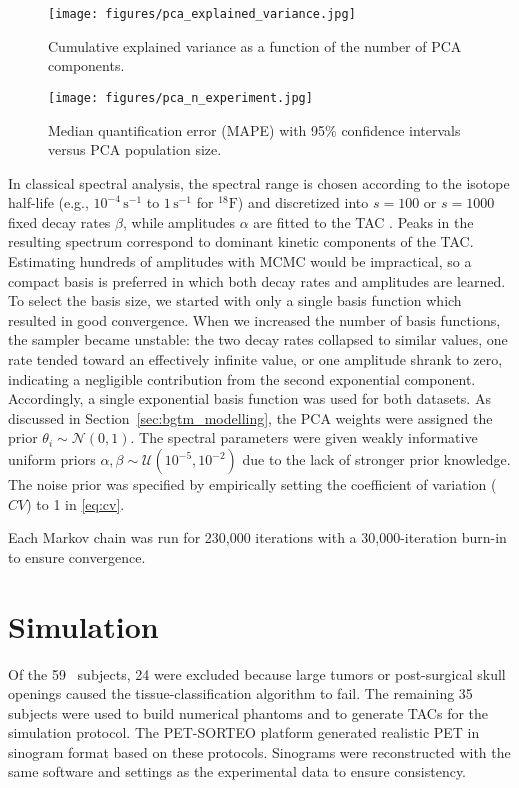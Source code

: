 \begin{figure}[h]
	\centering
	\texttt{[image: figures/pca\_explained\_variance.jpg]}
	\caption{Cumulative explained variance as a function of the number of PCA components.}
	\label{fig:pca_variance}
\end{figure}

\begin{figure}[h]
	\centering
	\texttt{[image: figures/pca\_n\_experiment.jpg]}
	\caption{Median quantification error (MAPE) with 95\% confidence intervals versus PCA population size.}
	\label{fig:pca_population}
\end{figure}

In classical spectral analysis, the spectral range is chosen according to the isotope half-life (e.g., \(10^{-4}\,\mathrm{s}^{-1}\) to \(1\,\mathrm{s}^{-1}\) for \(^{18}\mathrm{F}\)) and discretized into \(s=100\) or \(s=1000\) fixed decay rates \(\beta\), while amplitudes \(\alpha\) are fitted to the TAC \cite{cunningham1993spectral}.
Peaks in the resulting spectrum correspond to dominant kinetic components of the TAC.
Estimating hundreds of amplitudes with MCMC would be impractical, so a compact basis is preferred in which both decay rates and amplitudes are learned.
To select the basis size, we started with only a single basis function which resulted in good convergence.
When we increased the number of basis functions, the sampler became unstable: the two decay rates collapsed to similar values, one rate tended toward an effectively infinite value, or one amplitude shrank to zero, indicating a negligible contribution from the second exponential component.
Accordingly, a single exponential basis function was used for both datasets.
As discussed in Section~\ref{sec:bgtm_modelling}, the PCA weights were assigned the prior \(\theta_i\sim\mathcal{N}(0,1)\).
The spectral parameters were given weakly informative uniform priors \(\alpha,\beta\sim\mathcal{U}(10^{-5},10^{-2})\) due to the lack of stronger prior knowledge. 
The noise prior was specified by empirically setting the coefficient of variation ($CV$) to 1 in \eqref{eq:cv}.

Each Markov chain was run for 230{,}000 iterations with a 30{,}000-iteration burn-in to ensure convergence.

\section{Simulation}\label{sec:results_simulation}
Of the 59 \fdg\ subjects, 24 were excluded because large tumors or post-surgical skull openings caused the tissue-classification algorithm to fail.
The remaining 35 subjects were used to build numerical phantoms and to generate TACs for the simulation protocol.
The PET-SORTEO platform generated realistic PET in sinogram format based on these protocols.
Sinograms were reconstructed with the same software and settings as the experimental data to ensure consistency.

